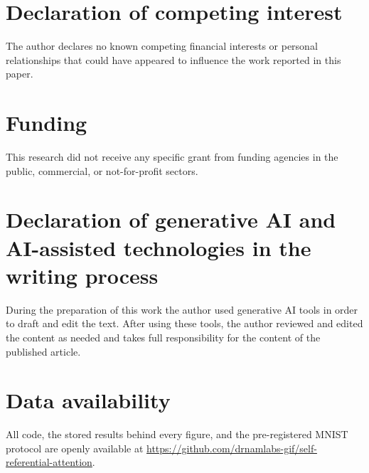 \documentclass[preprint,12pt,authoryear]{elsarticle}
\begin{document}
\section*{Declaration of competing interest}
The author declares no known competing financial interests or
personal relationships that could have appeared to influence the work
reported in this paper.

\section*{Funding}
This research did not receive any specific grant from funding agencies in
the public, commercial, or not-for-profit sectors.

\section*{Declaration of generative AI and AI-assisted technologies in the writing process}
During the preparation of this work the author used generative AI tools in order to
draft and edit the text. After using these tools, the author reviewed and edited the
content as needed and takes full responsibility for the content of the published article.

\section*{Data availability}
All code, the stored results behind every figure, and the pre-registered
MNIST protocol are openly available at
\url{https://github.com/drnamlabs-gif/self-referential-attention}.
\end{document}
